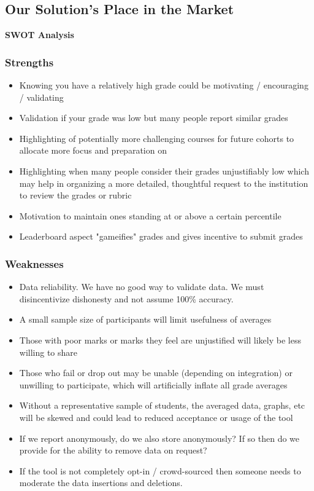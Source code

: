 \documentclass{article}
\begin{document}
\subsection{Our Solution's Place in the Market}
\textbf{SWOT Analysis}
\subsubsection{Strengths}
\begin{itemize}
    \item Knowing you have a relatively high grade could be motivating / encouraging / validating
    \item Validation if your grade was low but many people report similar grades
    \item Highlighting of potentially more challenging courses for future cohorts to allocate more focus and preparation on
    \item Highlighting when many people consider their grades unjustifiably low which may help in organizing a more detailed, thoughtful request to the institution to review the grades or rubric
    \item Motivation to maintain ones standing at or above a certain percentile
    \item Leaderboard aspect "gameifies" grades and gives incentive to submit grades
\end{itemize}
\subsubsection{Weaknesses}
\begin{itemize}
    \item Data reliability. We have no good way to validate data. We must disincentivize dishonesty and not assume 100\% accuracy.
    \item A small sample size of participants will limit usefulness of averages
    \item Those with poor marks or marks they feel are unjustified will likely be less willing to share
    \item Those who fail or drop out may be unable (depending on integration) or unwilling to participate, which will artificially inflate all grade averages
    \item Without a   representative sample of students, the averaged data, graphs, etc will be skewed and could lead to reduced acceptance or usage of the tool
    \item If we report anonymously, do we also store anonymously? If so then do we provide for the ability to remove data on request?
    \item If the tool is not completely opt-in / crowd-sourced then someone needs to moderate the data insertions and deletions.
\end{itemize}
\end{document}
